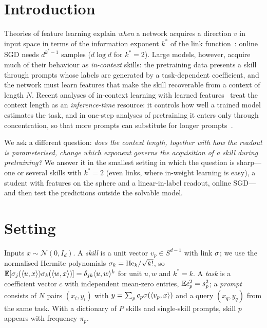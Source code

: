 \section{Introduction}
\label{sec:intro}
Theories of feature learning explain \emph{when} a network acquires a direction $v$ in input space in terms of the information
exponent $k^*$ of the link function~\citep{benarous2021online}: online SGD needs $d^{k^*-1}$ samples ($d\log d$ for $k^*=2$). Large
models, however, acquire much of their behaviour as \emph{in-context} skills: the pretraining data presents a skill through
prompts whose labels are generated by a task-dependent coefficient, and the network must learn features that make the skill
recoverable from a context of length $N$. Recent analyses of in-context learning with learned features~\citep{oko2024pretrained,
nishikawa2025nonlinear,kim2024transformers,gu2026incontext} treat the context length as an \emph{inference-time} resource: it
controls how well a trained model estimates the task, and in one-step analyses of pretraining it enters only through
concentration, so that more prompts can substitute for longer prompts~\citep[Remark~3]{oko2024pretrained}.

We ask a different question: \emph{does the context length, together with how the readout is parameterised, change which
exponent governs the acquisition of a skill during pretraining?} We answer it in the smallest setting in which the question is
sharp---one or several skills with $k^*=2$ (even links, where in-weight learning is easy), a student with features on the sphere
and a linear-in-label readout, online SGD---and then test the predictions outside the solvable model.

\section{Setting}
\label{sec:setup}
Inputs $x\sim\mathcal N(0,I_d)$. A \emph{skill} is a unit vector $v_p\in S^{d-1}$ with link $\sigma$; we use the normalised Hermite
polynomials $\sigma_k=\mathrm{He}_k/\sqrt{k!}$, so $\mathbb{E}[\sigma_j(\langle u,x\rangle)\sigma_k(\langle w,x\rangle)]=\delta_{jk}\langle u,w\rangle^k$ for unit
$u,w$ and $k^*=k$. A \emph{task} is a coefficient vector $c$ with independent mean-zero entries, $\mathbb{E} c_p^2=s_p^2$; a \emph{prompt}
consists of $N$ pairs $(x_i,y_i)$ with $y=\sum_p c_p\sigma(\langle v_p,x\rangle)$ and a query $(x_q,y_q)$ from the same task. With a
dictionary of $P$ skills and single-skill prompts, skill $p$ appears with frequency $\pi_p$.

